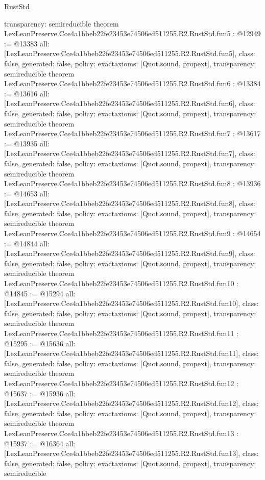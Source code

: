 \begin{lexlean}{RustStd}
\begin{coremodule}
{  transparency: semireducible
}
theorem LexLeanPreserve.Cce4a1bbeb22fe23453e74506ed511255.R2.RustStd.fun5 : @12949 := @13383 {
  all: [LexLeanPreserve.Cce4a1bbeb22fe23453e74506ed511255.R2.RustStd.fun5],
  class: false,
  generated: false,
  policy: exact{axioms: [Quot.sound, propext]},
  transparency: semireducible
}
theorem LexLeanPreserve.Cce4a1bbeb22fe23453e74506ed511255.R2.RustStd.fun6 : @13384 := @13616 {
  all: [LexLeanPreserve.Cce4a1bbeb22fe23453e74506ed511255.R2.RustStd.fun6],
  class: false,
  generated: false,
  policy: exact{axioms: [Quot.sound, propext]},
  transparency: semireducible
}
theorem LexLeanPreserve.Cce4a1bbeb22fe23453e74506ed511255.R2.RustStd.fun7 : @13617 := @13935 {
  all: [LexLeanPreserve.Cce4a1bbeb22fe23453e74506ed511255.R2.RustStd.fun7],
  class: false,
  generated: false,
  policy: exact{axioms: [Quot.sound, propext]},
  transparency: semireducible
}
theorem LexLeanPreserve.Cce4a1bbeb22fe23453e74506ed511255.R2.RustStd.fun8 : @13936 := @14653 {
  all: [LexLeanPreserve.Cce4a1bbeb22fe23453e74506ed511255.R2.RustStd.fun8],
  class: false,
  generated: false,
  policy: exact{axioms: [Quot.sound, propext]},
  transparency: semireducible
}
theorem LexLeanPreserve.Cce4a1bbeb22fe23453e74506ed511255.R2.RustStd.fun9 : @14654 := @14844 {
  all: [LexLeanPreserve.Cce4a1bbeb22fe23453e74506ed511255.R2.RustStd.fun9],
  class: false,
  generated: false,
  policy: exact{axioms: [Quot.sound, propext]},
  transparency: semireducible
}
theorem LexLeanPreserve.Cce4a1bbeb22fe23453e74506ed511255.R2.RustStd.fun10 : @14845 := @15294 {
  all: [LexLeanPreserve.Cce4a1bbeb22fe23453e74506ed511255.R2.RustStd.fun10],
  class: false,
  generated: false,
  policy: exact{axioms: [Quot.sound, propext]},
  transparency: semireducible
}
theorem LexLeanPreserve.Cce4a1bbeb22fe23453e74506ed511255.R2.RustStd.fun11 : @15295 := @15636 {
  all: [LexLeanPreserve.Cce4a1bbeb22fe23453e74506ed511255.R2.RustStd.fun11],
  class: false,
  generated: false,
  policy: exact{axioms: [Quot.sound, propext]},
  transparency: semireducible
}
theorem LexLeanPreserve.Cce4a1bbeb22fe23453e74506ed511255.R2.RustStd.fun12 : @15637 := @15936 {
  all: [LexLeanPreserve.Cce4a1bbeb22fe23453e74506ed511255.R2.RustStd.fun12],
  class: false,
  generated: false,
  policy: exact{axioms: [Quot.sound, propext]},
  transparency: semireducible
}
theorem LexLeanPreserve.Cce4a1bbeb22fe23453e74506ed511255.R2.RustStd.fun13 : @15937 := @16364 {
  all: [LexLeanPreserve.Cce4a1bbeb22fe23453e74506ed511255.R2.RustStd.fun13],
  class: false,
  generated: false,
  policy: exact{axioms: [Quot.sound, propext]},
  transparency: semireducible
}
\end{coremodule}
\end{lexlean}
